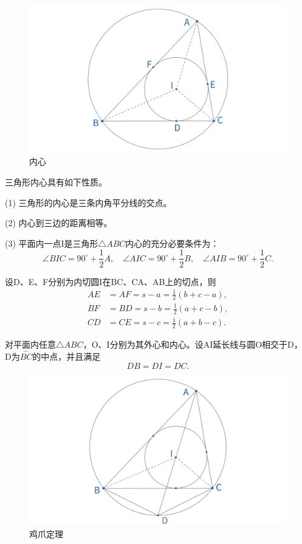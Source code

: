 \begin{figure}[H]
    \centering
    \includegraphics[width=0.8\linewidth]{figures/三角形五心/内心.png}
    \caption{内心}
\end{figure}

\begin{proposition}[内心性质]
    三角形内心具有如下性质。
    
    (1) 三角形的内心是三条内角平分线的交点。

    (2) 内心到三边的距离相等。

    (3) 平面内一点I是三角形$\triangle ABC$内心的充分必要条件为：
    $$\angle BIC = 90^\circ +\frac{1}{2}A,\quad \angle AIC = 90^\circ +\frac{1}{2}B,
    \quad \angle AIB =90^\circ +\frac{1}{2}C.$$

\end{proposition}


\begin{proposition}[切线长性质]
    设D、E、F分别为内切圆I在BC、CA、AB上的切点，则
    $$
    \begin{aligned}
    AE&=AF=s-a = \frac{1}{2}(b+c - a),\\
    BF&=BD=s - b =\frac{1}{2}(a+c - b),\\
    CD&=CE=s - c= \frac{1}{2}(a+b - c).
    \end{aligned}
    $$
\end{proposition}



\newpage 
\begin{theorem}[鸡爪定理]
    对平面内任意$\triangle ABC$，O、I分别为其外心和内心。设AI延长线与圆O相交于D，
    D为$\overset{{\frown}}{BC}$的中点，并且满足
    $$DB=DI=DC.$$
\end{theorem}

\begin{figure}[H]
    \centering
    \includegraphics[width=0.8\linewidth]{figures/三角形五心/鸡爪定理.png}
    \caption{鸡爪定理}
\end{figure}

